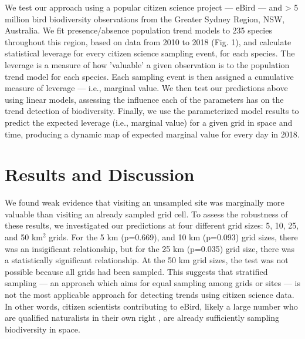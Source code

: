 \documentclass[9pt,twocolumn,twoside,lineno]{pnas-new}
\begin{document}
We test our approach using a popular citizen science project --- eBird \cite{sullivan2009ebird} --- and > 5 million bird biodiversity observations from the Greater Sydney Region, NSW, Australia. We fit presence/absence population trend models to 235 species throughout this region, based on data from 2010 to 2018 (Fig. 1), and calculate statistical leverage for every citizen science sampling event, for each species. The leverage is a measure of how 'valuable' a given observation is to the population trend model for each species. Each sampling event is then assigned a cumulative measure of leverage --- i.e., marginal value. We then test our predictions above using linear models, assessing the influence each of the parameters has on the trend detection of biodiversity. Finally, we use the parameterized model results to predict the expected leverage (i.e., marginal value) for a given grid in space and time, producing a dynamic map of expected marginal value for every day in 2018.

\section*{Results and Discussion}
We found weak evidence that visiting an unsampled site was marginally more valuable than visiting an already sampled grid cell. To assess the robustness of these results, we investigated our predictions at four different grid sizes: 5, 10, 25, and 50 km$^{2}$ grids. For the 5 km (p=0.669), and 10 km (p=0.093) grid sizes, there was an insigificant relationship, but for the 25 km (p=0.035) grid size, there was a statistically significant relationship. At the 50 km grid sizes, the test was not possible because all grids had been sampled. This suggests that stratified sampling --- an approach which aims for equal sampling among grids or sites --- \cite{baillie2008toward, longino1997biodiversity} is not the most applicable approach for detecting trends using citizen science data. In other words, citizen scientists contributing to eBird, likely a large number who are qualified naturalists in their own right \cite{callaghan2018unnatural}, are already sufficiently sampling biodiversity in space.
\end{document}
